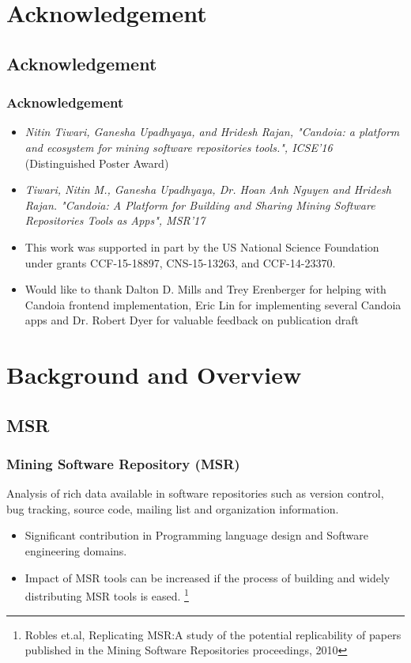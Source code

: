 \section{Acknowledgement}
\subsection{Acknowledgement}
        \begin{frame}
        \frametitle{Acknowledgement}
            \begin{itemize}
               \item \tiny{\emph{Nitin Tiwari, Ganesha Upadhyaya, and Hridesh Rajan, "Candoia: a
                platform and ecosystem for mining software repositories tools.",
                ICSE'16}} (Distinguished Poster Award)\\
                \item \tiny{\emph{Tiwari, Nitin M., Ganesha Upadhyaya, Dr. Hoan Anh Nguyen and Hridesh Rajan.
                    "Candoia: A Platform for Building and Sharing Mining Software Repositories Tools as Apps", MSR'17}} \\
                \item This work was supported in part by the US National Science Foundation under grants CCF-15-18897, CNS-15-13263, and CCF-14-23370.
                \item Would like to thank Dalton D. Mills and Trey Erenberger for helping with
                Candoia frontend implementation, Eric Lin for implementing several Candoia apps
                and Dr. Robert Dyer for valuable feedback on publication draft
            \end{itemize}
        \end{frame}

\section{Background and Overview}
\subsection{MSR}
    \begin{frame}
    \frametitle{Mining Software Repository (MSR)}
    Analysis of rich data available in software repositories such as version control, bug
    tracking, source code, mailing list and organization information.

    \begin{itemize}
        \item Significant contribution in Programming language design and Software engineering domains.
        \item Impact of MSR tools can be increased if the process of building and widely distributing MSR tools is eased.
        \footnote{Robles et.al, Replicating MSR:A study of the potential replicability of papers
        published in the Mining Software Repositories proceedings, 2010}
    \end{itemize}
    \end{frame}

